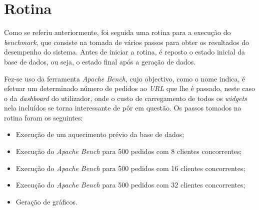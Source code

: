 \section{Rotina}

Como se referiu anteriormente, foi seguida uma rotina para a execução do \emph{benchmark}, que consiste na tomada de vários passos para obter os resultados do desempenho do sistema. Antes de iniciar a rotina, é reposto o estado inicial da base de dados, ou seja, o estado final após a geração de dados.

Fez-se uso da ferramenta \emph{Apache Bench}, cujo objectivo, como o nome indica, é efetuar um determinado número de pedidos ao \emph{URL} que lhe é passado, neste caso o da \emph{dashboard} do utilizador, onde o custo de carregamento de todos os \emph{widgets} nela incluídos se torna interessante de pôr em questão. Os passos tomados na rotina foram os seguintes:

\begin{itemize}
	\item Execução de um aquecimento prévio da base de dados;
	\item Execução do \emph{Apache Bench} para 500 pedidos com 8 clientes concorrentes;
	\item Execução do \emph{Apache Bench} para 500 pedidos com 16 clientes concorrentes;
	\item Execução do \emph{Apache Bench} para 500 pedidos com 32 clientes concorrentes;
	\item Geração de gráficos.
\end{itemize}

